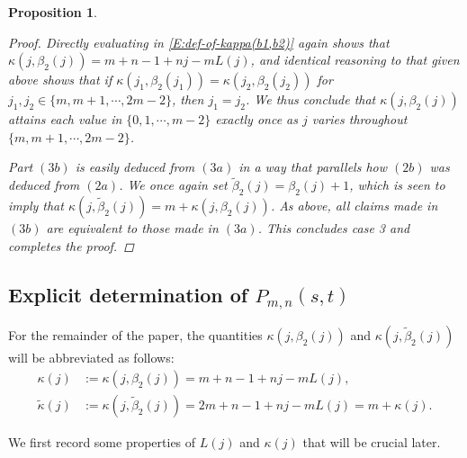 \documentclass[letterpaper,11pt,reqno]{amsart}
\theoremstyle{plain}
\newtheorem{proposition}[equation]{Proposition}
\theoremstyle{definition}
\theoremstyle{remark}
\theoremstyle{remark}
\numberwithin{equation}{section}
\begin{document}
\begin{proposition}
\begin{proof}
Directly evaluating in \eqref{E:def-of-kappa(b1,b2)} again shows that $\kappa(j,\beta_2(j)) = m+n-1+nj-mL(j)$, and identical reasoning to that given above shows that if $\kappa(j_1,\beta_2(j_1)) = \kappa(j_2,\beta_2(j_2))$ for $j_1,j_2 \in \{m,m+1,\cdots,2m-2 \}$, then $j_1 = j_2$.
We thus conclude that $\kappa(j,\beta_2(j))$ attains each value in $\{0,1,\cdots,m-2 \}$ exactly once as $j$ varies throughout $\{m,m+1,\cdots,2m-2 \}$.

Part $(3b)$ is easily deduced from $(3a)$ in a way that parallels how $(2b)$ was deduced from $(2a)$.
We once again set $\tilde\beta_2(j) = \beta_2(j)+1$, which is seen to imply that $\kappa(j,\tilde\beta_2(j)) = m + \kappa(j,\beta_2(j))$.
As above, all claims made in $(3b)$ are equivalent to those made in $(3a)$.
This concludes case 3 and completes the proof.
\end{proof}
\end{proposition}

\subsection{Explicit determination of $P_{m,n}(s,t)$}\label{SS:explicit-determination-of-Pmn}

For the remainder of the paper, the quantities $\kappa(j,\beta_2(j))$ and $\kappa(j,\tilde\beta_2(j))$ will be abbreviated as follows:
\begin{subequations}
\begin{align}
\kappa(j) &:= \kappa(j,\beta_2(j)) = m + n - 1 +nj - mL(j), \label{def-of-kappaj} \\
\tilde\kappa(j) &:= \kappa(j,\tilde\beta_2(j)) = 2m + n - 1 +nj - mL(j) = m + \kappa(j). \label{def-of-kappatildej}
\end{align}
\end{subequations}

We first record some properties of $L(j)$ and $\kappa(j)$ that will be crucial later.
\end{document}
